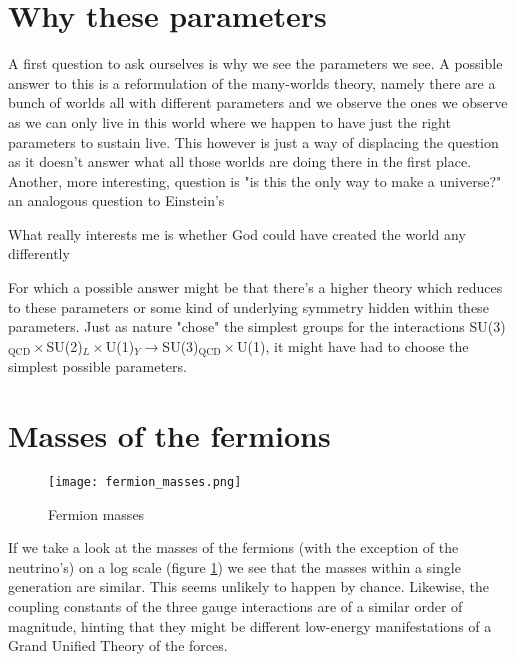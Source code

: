 \documentclass[twoside,twocolumn,11pt]{article} %
\begin{document}
\section{Why these parameters}
A first question to ask ourselves is why we see the parameters we see. A possible answer to this is a reformulation of the many-worlds theory, namely there are a bunch of worlds all with different parameters and we observe the ones we observe as we can only live in this world where we happen to have just the right parameters to sustain live. This however is just a way of displacing the question as it doesn't answer what all those worlds are doing there in the first place. Another, more interesting, question is "is this the only way to make a universe?" an analogous question to Einstein's 
\begin{displayquote}
	What really interests me is whether God could have created the world any differently
\end{displayquote}
For which a possible answer might be that there's a higher theory which reduces to these parameters or some kind of underlying symmetry hidden within these parameters. Just as nature "chose" the simplest groups for the interactions SU(3)${}_{\text{QCD}}\times$SU(2)${}_L\times$U(1)${}_Y \rightarrow$SU(3)$_{\text{QCD}}\times$U(1), it might have had to choose the simplest possible parameters.

\section{Masses of the fermions}
\begin{figure}[H]
	\texttt{[image: fermion\_masses.png]}
	\caption{Fermion masses}
	\label{fig:fermion masses}
\end{figure}
If we take a look at the masses of the fermions (with the exception of the neutrino's) on a log scale (figure \ref{fig:fermion masses}) we see that the masses within a single generation are similar. This seems unlikely to happen by chance. Likewise, the coupling constants of the three gauge interactions are of a similar order of magnitude, hinting that they might be different low-energy manifestations of a Grand Unified Theory of the forces.
\end{document}
